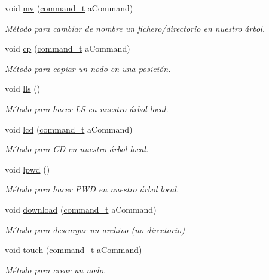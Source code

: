 \begin{DoxyCompactItemize}
void \hyperlink{classTerminal_ae71eae23c6e320c30e8f4dd44f59201a}{mv} (\hyperlink{structcommand__t}{command\+\_\+t} a\+Command)
\begin{DoxyCompactList}\small\item\em Método para cambiar de nombre un fichero/directorio en nuestro árbol. \end{DoxyCompactList}\item 
void \hyperlink{classTerminal_afff07151e9fdceeccb3772b3eff66fd1}{cp} (\hyperlink{structcommand__t}{command\+\_\+t} a\+Command)
\begin{DoxyCompactList}\small\item\em Método para copiar un nodo en una posición. \end{DoxyCompactList}\item 
void \hyperlink{classTerminal_a5a72cb107514fb7c5f4d345c3da4a064}{lls} ()
\begin{DoxyCompactList}\small\item\em Método para hacer LS en nuestro árbol local. \end{DoxyCompactList}\item 
void \hyperlink{classTerminal_a185d7b22ac6e3fc5bd55b711926e8089}{lcd} (\hyperlink{structcommand__t}{command\+\_\+t} a\+Command)
\begin{DoxyCompactList}\small\item\em Método para CD en nuestro árbol local. \end{DoxyCompactList}\item 
void \hyperlink{classTerminal_ac05d53dd80d6dfd7b4e865b1a372969a}{lpwd} ()
\begin{DoxyCompactList}\small\item\em Método para hacer P\+WD en nuestro árbol local. \end{DoxyCompactList}\item 
void \hyperlink{classTerminal_ae65a3c6d061449b0607e3caa1691b3c7}{download} (\hyperlink{structcommand__t}{command\+\_\+t} a\+Command)
\begin{DoxyCompactList}\small\item\em Método para descargar un archivo (no directorio) \end{DoxyCompactList}\item 
void \hyperlink{classTerminal_a8b0df976ff03c2dfd4cc36a99cad54e2}{touch} (\hyperlink{structcommand__t}{command\+\_\+t} a\+Command)
\begin{DoxyCompactList}\small\item\em Método para crear un nodo. \end{DoxyCompactList}\end{DoxyCompactItemize}


